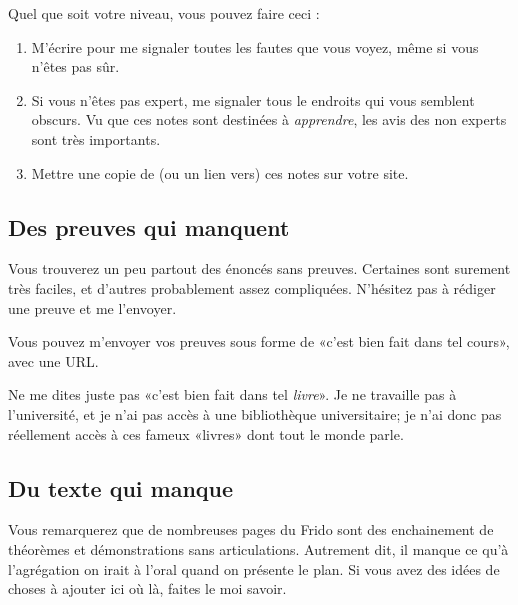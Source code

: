 Quel que soit votre niveau, vous pouvez faire ceci :

\begin{enumerate}
    \item
        M'écrire pour me signaler toutes les fautes que vous voyez, même si vous n'êtes pas sûr.
    \item
        Si vous n'êtes pas expert, me signaler tous le endroits qui vous semblent obscurs. Vu que ces notes sont destinées à \emph{apprendre}, les avis des non experts sont très importants.
    \item
        Mettre une copie de (ou un lien vers) ces notes sur votre site.
\end{enumerate}

\subsection{Des preuves qui manquent}

Vous trouverez un peu partout des énoncés sans preuves. Certaines sont surement très faciles, et d'autres probablement assez compliquées. N'hésitez pas à rédiger une preuve et me l'envoyer.

Vous pouvez m'envoyer vos preuves sous forme de «c'est bien fait dans tel cours», avec une URL.

Ne me dites juste pas «c'est bien fait dans tel \emph{livre}». Je ne travaille pas à l'université, et je n'ai pas accès à une bibliothèque universitaire; je n'ai donc pas réellement accès à ces fameux «livres» dont tout le monde parle.

\subsection{Du texte qui manque}

Vous remarquerez que de nombreuses pages du Frido sont des enchainement de théorèmes et démonstrations sans articulations. Autrement dit, il manque ce qu'à l'agrégation on irait à l'oral quand on présente le plan. Si vous avez des idées de choses à ajouter ici où là, faites le moi savoir.


